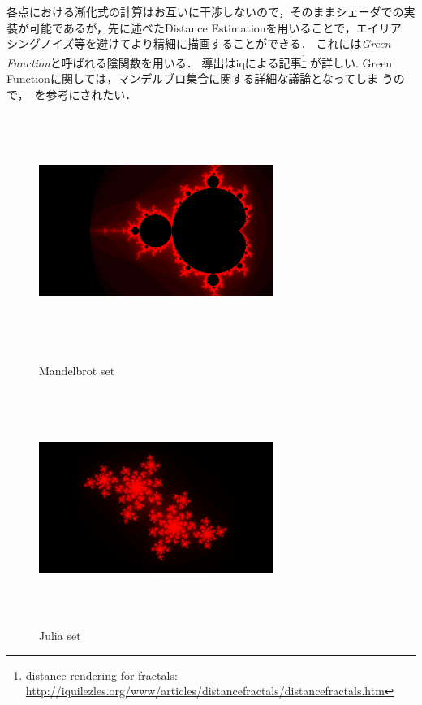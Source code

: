 各点における漸化式の計算はお互いに干渉しないので，そのままシェーダでの実
装が可能であるが，先に述べたDistance Estimationを用いることで，エイリア
シングノイズ等を避けてより精細に描画することができる．
これには{\it Green Function}と呼ばれる陰関数を用いる．
導出はiqによる記事\footnote{distance rendering for fractals:
\url{http://iquilezles.org/www/articles/distancefractals/distancefractals.htm}}
が詳しい.
Green Functionに関しては，マンデルブロ集合に関する詳細な議論となってしま
うので，~\cite{douady1984exploring}を参考にされたい．

\begin{figure}[htbp]
 \begin{minipage}{0.49\hsize}
  \begin{center}
   \includegraphics[width=3in, height=3in, keepaspectratio]{../img/fractal/mandelbrot.pdf}
   \caption{Mandelbrot set}
   \label{fig:mandelbrot}
  \end{center}
 \end{minipage}
 \begin{minipage}{0.49\hsize}
     \includegraphics[width=3in, height=3in, keepaspectratio]{../img/fractal/julia.pdf}
   \caption{Julia set}
   \label{fig:julia}
 \end{minipage}
\end{figure}

